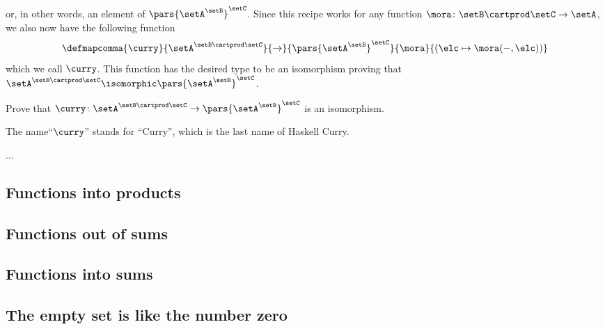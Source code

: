 or, in other words, an element of $\pars{\setA^\setB}^\setC$. Since this recipe works for any function $\mora \colon \setB \cartprod \setC \to \setA$, we also now have the following function
\begin{equation}
\defmapcomma{
         \curry
        }{
           \setA^{\setB \cartprod \setC}
        }{
           \to
        }{
           \pars{\setA^\setB}^\setC 
        }{
           \mora
        }{
           (\elc \mapsto \mora ( -, \elc))
           }
\end{equation}
which we call $\curry$. This function has the desired type to be an isomorphism proving that $\setA^{\setB \cartprod \setC}  \isomorphic \pars{\setA^\setB}^\setC$.

\begin{exercise}\label{ex:currying-is-an-iso}
Prove that  $\curry \colon \setA^{\setB \cartprod \setC} \to \pars{\setA^\setB}^\setC$ is an isomorphism. 
\end{exercise}

\begin{solution}
\end{solution}

The name``$\curry$'' stands for ``Curry'', which is the last name of Haskell Curry. 

...
 

\subsection{Functions into products}


\subsection{Functions out of sums}


\subsection{Functions into sums}


\subsection{The empty set is like the number zero}

